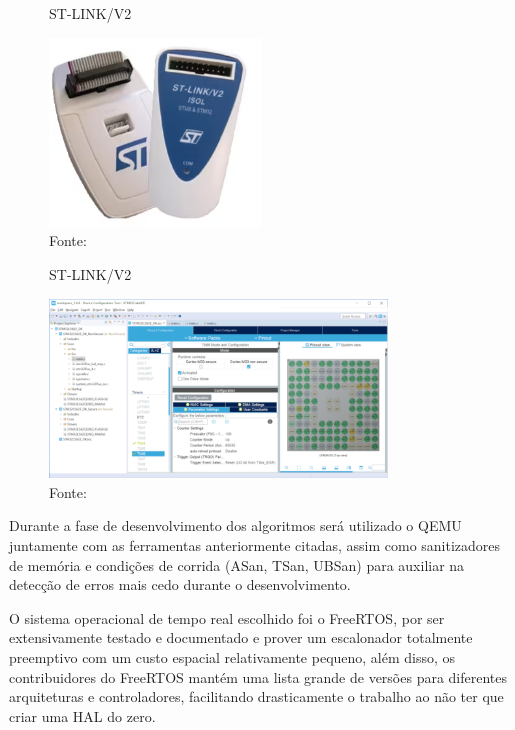 \begin{figure}[H]
    \centering
    \captionsetup{justification=centering}
    \caption{ST-LINK/V2}
    \includegraphics[width=0.50\textwidth]{assets/st_link.png}
    \captionsetup{justification=raggedright}
    \caption*{Fonte: }
    \label{fig:stLink}
\end{figure}

\begin{figure}[H]
    \centering
    \captionsetup{justification=centering}
    \caption{ST-LINK/V2}
    \includegraphics[width=0.80\textwidth]{assets/stmcube_ide.png}
    \captionsetup{justification=raggedright}
    \caption*{Fonte: }
    \label{fig:stmCubeIDE}
\end{figure}

Durante a fase de desenvolvimento dos algoritmos será utilizado o QEMU juntamente com as ferramentas anteriormente citadas, assim como sanitizadores de memória e condições de corrida (ASan, TSan, UBSan) para auxiliar na detecção de erros mais cedo durante o desenvolvimento.

O sistema operacional de tempo real escolhido foi o FreeRTOS, por ser extensivamente testado e documentado e prover um escalonador totalmente preemptivo com um custo espacial relativamente pequeno, além disso, os contribuidores do FreeRTOS mantém uma lista grande de versões para diferentes arquiteturas e controladores, facilitando drasticamente o trabalho ao não ter que criar uma HAL do zero.

